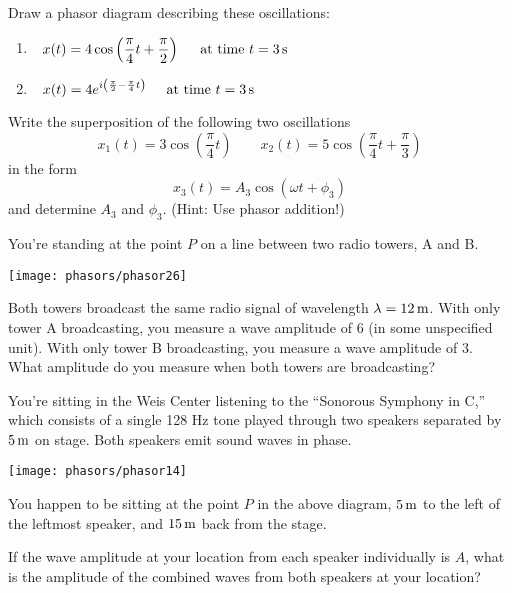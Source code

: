 \begin{problem}
Draw a phasor diagram describing these oscillations:
\begin{enumerate}
\item $\displaystyle\hspace{0.1in}x(t) = 4 \cos\left(\frac{\pi}{4}t 
+ \frac{\pi}{2}\right) \hspace{0.2in} \mbox{at time $t=3\,\mbox{s}$}$
\vspace{0.1in}

\item $\displaystyle\hspace{0.1in}x(t) = 4 e^{i\left(\frac{\pi}{2} 
- \frac{\pi}{4}t\right)} \hspace{0.2in} \mbox{at time $t=3\,\mbox{s}$}$
\end{enumerate}
\end{problem}

\begin{problem}
Write the superposition of the following two oscillations
\[ 
x_1(t) = 3\cos\left(\frac{\pi}{4}t\right)\quad\quad
 x_2(t) = 5\cos\left(\frac{\pi}{4}t + \frac{\pi}{3}\right) 
\]
in the form
\[ 
x_3(t) = A_3 \cos\left(\omega t + \phi_3\right) 
\]
and determine $A_3$ and $\phi_3$.  (Hint: Use phasor addition!)
\end{problem}

\newpage

\begin{problem}
You're standing at the point $P$ on a line between two radio towers, 
A and B. 

 \texttt{[image: phasors/phasor26]} 

\noindent Both towers broadcast the same radio signal of wavelength $\lambda =
12\,\mbox{m}$. With only tower A broadcasting, you measure a wave amplitude
of 6 (in some unspecified unit).  With only tower B broadcasting, you
measure a wave amplitude of 3. What amplitude do you measure when both
towers are broadcasting?
\label{prob:between_towers}
\end{problem}


\begin{problem}
You're sitting in the Weis Center listening to the 
``Sonorous Symphony in C,'' which consists of
a single 128 Hz tone played through two speakers separated by
$5\,\mbox{m}$ on stage. Both speakers emit sound waves in phase.

 \texttt{[image: phasors/phasor14]} 

\noindent You happen to be sitting at the point $P$ in the above
diagram, $5\,\mbox{m}$ to the left of the leftmost speaker, and
$15\,\mbox{m}$ back from the stage.

If the wave amplitude at your location from each speaker individually
is $A$, what is the amplitude of the combined waves from both speakers
at your location?
\end{problem}

